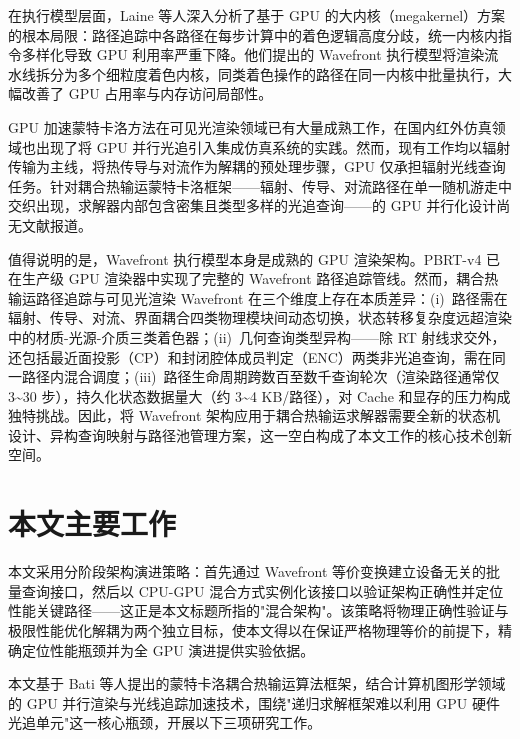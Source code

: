 在执行模型层面，Laine 等人深入分析了基于 GPU 的大内核（megakernel）方案的根本局限：路径追踪中各路径在每步计算中的着色逻辑高度分歧，统一内核内指令多样化导致 GPU 利用率严重下降。他们提出的 Wavefront 执行模型将渲染流水线拆分为多个细粒度着色内核，同类着色操作的路径在同一内核中批量执行，大幅改善了 GPU 占用率与内存访问局部性\cite{laineMegakernelsConsideredHarmful2013}。

GPU 加速蒙特卡洛方法在可见光渲染领域已有大量成熟工作，在国内红外仿真领域也出现了将 GPU 并行光追引入集成仿真系统的实践\cite{XuFeiFanJiYuOptiXBingXingGuangXianZhuiZongJiSuanDeHongWaiChengXiangFangZhenRuanJianYanZhi2022}。然而，现有工作均以辐射传输为主线，将热传导与对流作为解耦的预处理步骤，GPU 仅承担辐射光线查询任务。针对耦合热输运蒙特卡洛框架——辐射、传导、对流路径在单一随机游走中交织出现，求解器内部包含密集且类型多样的光追查询——的 GPU 并行化设计尚无文献报道。

值得说明的是，Wavefront 执行模型本身是成熟的 GPU 渲染架构。PBRT-v4\cite{pharrPhysicallyBasedRendering2023} 已在生产级 GPU 渲染器中实现了完整的 Wavefront 路径追踪管线。然而，耦合热输运路径追踪与可见光渲染 Wavefront 在三个维度上存在本质差异：(i)~路径需在辐射、传导、对流、界面耦合四类物理模块间动态切换，状态转移复杂度远超渲染中的材质-光源-介质三类着色器；(ii)~几何查询类型异构——除 RT 射线求交外，还包括最近面投影（CP）和封闭腔体成员判定（ENC）两类非光追查询，需在同一路径内混合调度；(iii)~路径生命周期跨数百至数千查询轮次（渲染路径通常仅 3\textasciitilde 30 步），持久化状态数据量大（约 3\textasciitilde 4 KB/路径），对 Cache 和显存的压力构成独特挑战。因此，将 Wavefront 架构应用于耦合热输运求解器需要全新的状态机设计、异构查询映射与路径池管理方案，这一空白构成了本文工作的核心技术创新空间。

\section{本文主要工作}
本文采用分阶段架构演进策略：首先通过 Wavefront 等价变换建立设备无关的批量查询接口，然后以 CPU-GPU 混合方式实例化该接口以验证架构正确性并定位性能关键路径——这正是本文标题所指的"混合架构"。该策略将物理正确性验证与极限性能优化解耦为两个独立目标，使本文得以在保证严格物理等价的前提下，精确定位性能瓶颈并为全 GPU 演进提供实验依据。

本文基于 Bati 等人\cite{batiCouplingConductionConvection2023}提出的蒙特卡洛耦合热输运算法框架，结合计算机图形学领域的 GPU 并行渲染与光线追踪加速技术，围绕"递归求解框架难以利用 GPU 硬件光追单元"这一核心瓶颈，开展以下三项研究工作。

